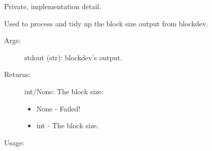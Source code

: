 \documentclass[letterpaper,10pt,english]{sphinxmanual}
\begin{document}
\begin{fulllineitems}
\label{\detokenize{linux:getdevinfo.linux.compute_block_size}}
Private, implementation detail.

Used to process and tidy up the block size output from blockdev.
\begin{description}
\item[{Args:}] \leavevmode
stdout (str):       blockdev’s output.

\item[{Returns:}] \leavevmode
int/None: The block size:
\begin{itemize}
\item {} 
None - Failed!

\item {} 
int  - The block size.

\end{itemize}

\end{description}

Usage:

\begin{sphinxVerbatim}[commandchars=\\\{\}]
\end{sphinxVerbatim}

\end{fulllineitems}

\end{document}
